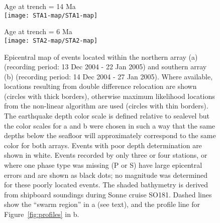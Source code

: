 \documentclass[reviewcopy]{elsart}
\renewcommand{\includegraphics}[2][]{\fbox{#2}}
\begin{document}
\begin{figure}
\begin{minipage}[t]{0.49\textwidth}
{ Age at trench = 14 Ma} \\
\texttt{[image: STA1-map/STA1-map]}
\end{minipage}\hfill%
\begin{minipage}[t]{0.49\textwidth}
{  Age at trench = 6 Ma} \\
\texttt{[image: STA2-map/STA2-map]}
\end{minipage}

\caption{Epicentral map of events located within the northern array
  (a) (recording period: 13 Dec 2004 - 22 Jan 2005) and southern array
  (b)  (recording period: 14 Dec 2004 - 27 Jan 2005). Where available, locations resulting
  from double difference relocation are shown (circles with thick
  borders), otherwise maximum likelihood locations from the non-linear
   algorithm are used (circles with thin borders).  
  The earthquake depth color scale is defined relative to sealevel but
  the color scales for a and b were chosen in such a way that the same depths
  below the seafloor will approximately correspond to the same color
  for both arrays.    Events
  with poor depth determination are shown in white. Events recorded by
  only three or four stations, or where one phase type was missing (P
  or S) have large epicentral errors and are shown as black dots; no
  magnitude was determined for these poorly located events.
  The shaded bathymetry is derived from shipboard
soundings during Sonne cruise SO181.  Dashed lines show the ``swarm
region'' in a (see text), and the profile line for
Figure~\protect\ref{fig:profiles} in b.}
\label{fig:epimaps}
\end{figure}
\end{document}
